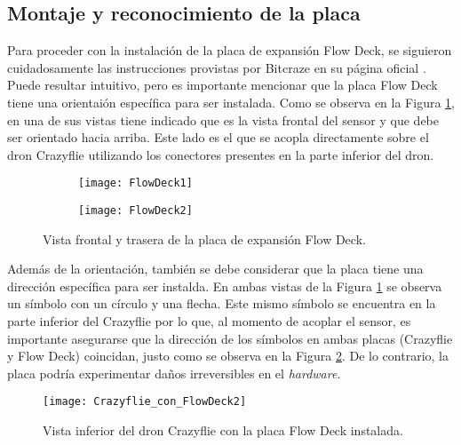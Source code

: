 \subsection{Montaje y reconocimiento de la placa}
Para proceder con la instalación de la placa de expansión Flow Deck, se siguieron cuidadosamente las instrucciones provistas por Bitcraze en su página oficial \cite{Crazyflie_expansion_decks}. Puede resultar intuitivo, pero es importante mencionar que la placa Flow Deck tiene una orientaión específica para ser instalada. Como se observa en la Figura \ref{fig:FlowDeck_ambas_vistas}, en una de sus vistas tiene indicado que es la vista frontal del sensor y que debe ser orientado hacia arriba. Este lado es el que se acopla directamente sobre el dron Crazyflie utilizando los conectores presentes en la parte inferior del dron. 

\begin{figure}[htbp]
	\centering
	\begin{subfigure}[b]{0.3\textwidth}
		\centering
		\texttt{[image: FlowDeck1]}
	\end{subfigure}
	\hspace{0.01\textwidth} %
	\begin{subfigure}[b]{0.3\textwidth}
		\centering
		\texttt{[image: FlowDeck2]}
	\end{subfigure}
	\caption{Vista frontal y trasera de la placa de expansión Flow Deck.}
	\label{fig:FlowDeck_ambas_vistas}
\end{figure}

Además de la orientación, también se debe considerar que la placa tiene una dirección específica para ser instalda. En ambas vistas de la Figura \ref{fig:FlowDeck_ambas_vistas} se observa un símbolo con un círculo y una flecha. Este mismo símbolo se encuentra en la parte inferior del Crazyflie por lo que, al momento de acoplar el sensor, es importante asegurarse que la dirección de los símbolos en ambas placas (Crazyflie y Flow Deck) coincidan, justo como se observa en la Figura \ref{fig:Crazyflie_con_FlowDeck}. De lo contrario, la placa podría experimentar daños irreversibles en el \textit{hardware}.

\begin{figure}[htbp]
	\centering
	\texttt{[image: Crazyflie\_con\_FlowDeck2]}
	\caption{Vista inferior del dron Crazyflie con la placa Flow Deck instalada.}
	\label{fig:Crazyflie_con_FlowDeck}
\end{figure} 

